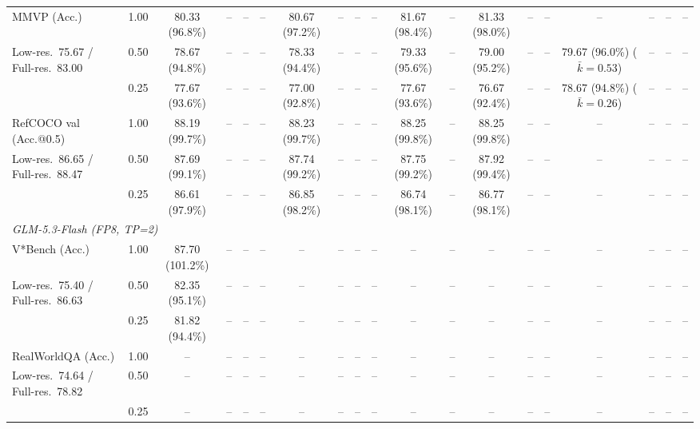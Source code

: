\begin{table}[t]
{\begin{tabular}{l c | c c c c | c c c c | c c | c c c | c c c c}
MMVP (Acc.) & 1.00 & 80.33 (96.8\%) & -- & -- & -- & 80.67 (97.2\%) & -- & -- & -- & \cellcolor{gray!15}81.67 (98.4\%) & -- & 81.33 (98.0\%) & -- & -- & -- & -- & -- & -- \\
{\footnotesize Low-res.\ 75.67 / Full-res.\ 83.00} & 0.50 & 78.67 (94.8\%) & -- & -- & -- & 78.33 (94.4\%) & -- & -- & -- & 79.33 (95.6\%) & -- & 79.00 (95.2\%) & -- & -- & 79.67 (96.0\%) {\footnotesize ($\bar k{=}0.53$)} & -- & -- & -- \\
 & 0.25 & 77.67 (93.6\%) & -- & -- & -- & 77.00 (92.8\%) & -- & -- & -- & 77.67 (93.6\%) & -- & 76.67 (92.4\%) & -- & -- & 78.67 (94.8\%) {\footnotesize ($\bar k{=}0.26$)} & -- & -- & -- \\
\cmidrule(lr){1-19}
RefCOCO val (Acc.@0.5) & 1.00 & \cellcolor{gray!15}88.19 (99.7\%) & -- & -- & -- & \cellcolor{gray!15}88.23 (99.7\%) & -- & -- & -- & \cellcolor{gray!15}88.25 (99.8\%) & -- & \cellcolor{gray!15}88.25 (99.8\%) & -- & -- & -- & -- & -- & -- \\
{\footnotesize Low-res.\ 86.65 / Full-res.\ 88.47} & 0.50 & \cellcolor{gray!15}87.69 (99.1\%) & -- & -- & -- & \cellcolor{gray!15}87.74 (99.2\%) & -- & -- & -- & \cellcolor{gray!15}87.75 (99.2\%) & -- & \cellcolor{gray!15}87.92 (99.4\%) & -- & -- & -- & -- & -- & -- \\
 & 0.25 & 86.61 (97.9\%) & -- & -- & -- & \cellcolor{gray!15}86.85 (98.2\%) & -- & -- & -- & \cellcolor{gray!15}86.74 (98.1\%) & -- & \cellcolor{gray!15}86.77 (98.1\%) & -- & -- & -- & -- & -- & -- \\
\midrule
\multicolumn{19}{l}{\emph{GLM-5.3-Flash (FP8, TP=2)}} \\
V*Bench (Acc.) & 1.00 & \cellcolor{gray!15}87.70 (101.2\%) & -- & -- & -- & -- & -- & -- & -- & -- & -- & -- & -- & -- & -- & -- & -- & -- \\
{\footnotesize Low-res.\ 75.40 / Full-res.\ 86.63} & 0.50 & 82.35 (95.1\%) & -- & -- & -- & -- & -- & -- & -- & -- & -- & -- & -- & -- & -- & -- & -- & -- \\
 & 0.25 & 81.82 (94.4\%) & -- & -- & -- & -- & -- & -- & -- & -- & -- & -- & -- & -- & -- & -- & -- & -- \\
\cmidrule(lr){1-19}
RealWorldQA (Acc.) & 1.00 & -- & -- & -- & -- & -- & -- & -- & -- & -- & -- & -- & -- & -- & -- & -- & -- & -- \\
{\footnotesize Low-res.\ 74.64 / Full-res.\ 78.82} & 0.50 & -- & -- & -- & -- & -- & -- & -- & -- & -- & -- & -- & -- & -- & -- & -- & -- & -- \\
 & 0.25 & -- & -- & -- & -- & -- & -- & -- & -- & -- & -- & -- & -- & -- & -- & -- & -- & -- \\

\end{tabular}}
\end{table}
